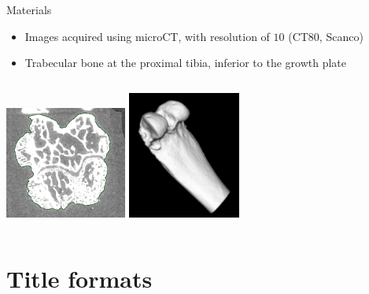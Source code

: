 \documentclass[10pt,aspectratio=169]{beamer}
\begin{document}
\begin{frame}[fragile]{Materials}
\begin{itemize} \itemsep1em
\item Images acquired using microCT, with resolution of $10$\si{\micro} (\si{\micro}CT80, Scanco)
\item Trabecular bone at the proximal tibia, inferior to the growth plate
\end{itemize}
\vspace{0.5cm}
\begin{columns}[onlytextwidth]
    \centering
    \includegraphics[width=4cm]{figures/bone_materials.png}
    \centering
    \includegraphics[width=3.7cm]{figures/bone_materials_3D.png}
\end{columns}
\end{frame}

\section{Title formats}
\end{document}
